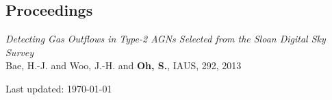 \documentclass[11pt,letterpaper]{article}
\begin{document}
\subsection*{Proceedings}

\begin{etaremune}
  \item {\it Detecting Gas Outflows in Type-2 AGNs Selected from the Sloan Digital Sky Survey}\\
  {{Bae}, H.-J. and {Woo}, J.-H. and {\bf {Oh}, S.}}, IAUS, 292, 2013
\end{etaremune}

\bigskip

\begin{center}
  \begin{footnotesize}
    Last updated: \today \\
  \end{footnotesize}
\end{center}
\end{document}

